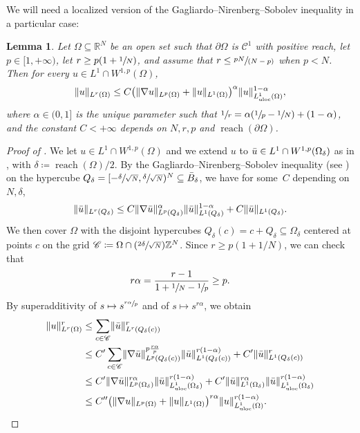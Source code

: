 \documentclass[10pt]{amsart}
\newcommand{\Psfrac}[2]{{(\sfrac{#1}{#2})}}
\newcommand{\spfrac}[2]{{\sfrac{#1}{(#2)}}}
\theoremstyle{plain}
\newtheorem{lemma}[theorem]{Lemma}
\theoremstyle{definition}
\newcommand{\R}{\mathbb{R}}
\newcommand{\Z}{\mathbb{Z}}
\newcommand{\Cspace}{\mathscr{C}}
\newcommand{\uloc}{L^1_\mathrm{uloc}}
\DeclarePairedDelimiter{\norm}{\lVert}{\rVert}
\DeclareMathOperator{\reach}{reach}
\begin{document}
We will need a localized version of the Gagliardo--Nirenberg--Sobolev inequality in a particular case:
\begin{lemma}\label{lemmaGagliardo}
Let \(\Omega\subseteq\R^N\) be an open set such that \(\partial\Omega\) is \(\Cspace^1\) with positive reach, let \(p\in [1,+\infty)\), let \(r\geq p(1+\sfrac{1}{N})\), and assume that \(r\leq\spfrac{pN}{N-p}\) when \(p<N\). Then for every \(u\in L^1\cap W^{1,p}(\Omega)\),
\[
\norm{u}_{L^r(\Omega)}\leq C \bigl(\norm{\nabla u}_{L^p(\Omega)}+\norm{u}_{L^1(\Omega)}\bigr)^\alpha \norm{u}_{\uloc({\Omega})}^{1-\alpha},
\]
where \(\alpha\in (0,1]\) is the unique parameter such that \(\sfrac 1r=\alpha (\sfrac 1p-\sfrac 1N)+(1-\alpha)\), and the constant \(C<+\infty\) depends on \(N,r,p\) and \(\reach(\partial\Omega)\).
\end{lemma}
\begin{proof}[Proof of ]
We let \(u\in L^1\cap W^{1,p}(\Omega)\) and we extend \(u\) to \(\Bar{u}\in L^1\cap W^{1,p}(\Omega_\delta)\) as in , with $\delta \coloneqq \reach(\Omega)/2$. By the Gagliardo--Nirenberg--Sobolev inequality (see \cite{nirenbergEllipticPartialDifferential1959}) on the hypercube \(Q_\delta=[-\sfrac{\delta}{\sqrt{N}},\sfrac{\delta}{\sqrt{N}})^N \subseteq \bar B_\delta\), we have for some~$C$ depending on $N,\delta$,
\[
\norm{\Bar{u}}_{L^r(Q_\delta)}\leq C \norm{\nabla \Bar{u}}_{L^p(Q_\delta)}^\alpha\norm{\Bar{u}}_{L^1(Q_\delta)}^{1-\alpha}+C\norm{\Bar{u}}_{L^1(Q_\delta)}.
\]
We then cover \(\Omega\) with the disjoint hypercubes \(Q_\delta(c)=c+Q_\delta\subseteq\Omega_\delta\) centered at points \(c\) on the grid \(\Cspace\coloneqq\Omega\cap \Psfrac{2\delta}{\sqrt{N}}\Z^N\). Since \(r \geq p(1+1/N)\), we can check that
\begin{equation}\label{superadditiveExponent}
r\alpha=\frac{r-1}{1+\sfrac 1N-\sfrac 1p}\geq p.
\end{equation}
By superadditivity of \(s\mapsto s^{\sfrac{r\alpha}{p}}\) and of \(s\mapsto s^{r\alpha}\), we obtain
\begin{align*}
\norm{u}_{L^r(\Omega)}^r&\leq \sum_{c\in \Cspace}\norm{\Bar{u}}^r_{L^r(Q_\delta(c))}\\
&\leq
C'\sum_{c\in \Cspace}\norm{\nabla \Bar{u}}_{L^p(Q_\delta(c))}^{p\frac{r\alpha}p}\norm{\Bar{u}}_{L^1(Q_\delta(c))}^{r(1-\alpha)}+C'\norm{\Bar{u}}^r_{L^1(Q_\delta(c))}\\
&\leq
C'\norm{\nabla \Bar{u}}_{L^p(\Omega_\delta)}^{r\alpha}\norm{\Bar{u}}_{\uloc({\Omega}_\delta)}^{r(1-\alpha)}+C'\norm{\Bar{u}}_{L^1(\Omega_\delta)}^{r\alpha}\norm{\Bar{u}}_{\uloc({\Omega}_\delta)}^{r(1-\alpha)}\\
&\leq
C''\bigl(\norm{\nabla u}_{L^p(\Omega)}+\norm{u}_{L^1(\Omega)}\bigr)^{r\alpha}\norm{u}_{\uloc({\Omega})}^{r(1-\alpha)}.\qedhere
\end{align*}
\end{proof}
\end{document}
